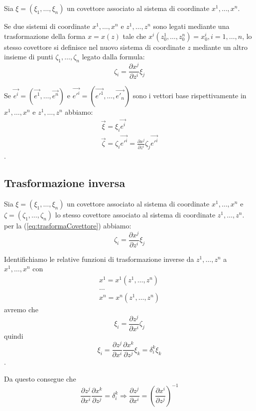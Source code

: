 \documentclass[a4paper,11pt]{article}
\begin{document}
Sia $\xi = (\xi_1, \dots , \xi_n)$ un covettore associato al sistema di coordinate $ x^1, \dots , x^n $.

Se due sistemi di coordinate $ x^1, \dots , x^n $ e $  z^1, \dots , z^n  $ sono legati mediante una trasformazione della forma $ x= x(z) $ tale che $ x^i (z_0^1, \dots , z_0^n) = x_0^i, i = 1, \dots , n $, lo stesso covettore si definisce nel nuovo sistema di coordinate $ z $ mediante un altro insieme di punti 
$ \zeta_1, \dots, \zeta_n $ legato dalla formula:
\begin{equation}\label{eq:trasformaCovettore}
  \zeta_i = \frac{\partial x^j}{\partial z^i} \xi_j
\end{equation}

Se $ \vec {e^i} = (\vec {e^1}, \dots, \vec {e^n}) $ e $ \vec {{e'}^i} = (\vec { {e'}^1}, \dots, \vec {{e'}_n}) $ sono i vettori base rispettivamente in $ x^1, \dots , x^n $ e $ z^1, \dots , z^n $ abbiamo:
\begin{eqnarray*}
  \vec \xi = \xi_i \vec {e^i}
  \\
  \vec \zeta = \zeta_i \vec {{e'}^i} = \frac{\partial x^j}{\partial z^i} \zeta_j \vec {{e'}^i}
\end{eqnarray*}
.

\subsection{Trasformazione inversa}

Sia $\xi = (\xi_1, \dots , \xi_n)$ un covettore associato al sistema di coordinate $ x^1, \dots , x^n $ e 
$\zeta = (\zeta_1, \dots , \zeta_n)$ lo stesso covettore associato al sistema di coordinate $ z^1, \dots , z^n $.
per la (\ref{eq:trasformaCovettore}) abbiamo:
\[
  \zeta_i = \frac{\partial x^j}{\partial z^i} \xi_j
\]

Identifichiamo le relative funzioni di trasformazione inverse da $ z^1, \dots , z^n $ a  $ x^1, \dots , x^n $  con
\begin{eqnarray*}
  x^1=x^1(z^1, \dots, z^n)
  \\
  \dots
  \\
  x^n=x^n(z^1, \dots, z^n)
\end{eqnarray*}
avremo che 
\[
  \xi_i = \frac{\partial z^j}{\partial x^i} \zeta_j
\]
quindi
\[
  \xi_i = \frac{\partial z^j}{\partial x^i} \frac{\partial x^k}{\partial z^j}  \xi_k = \delta _i^k \xi _k
\].

Da questo consegue che
\begin{equation}
	\frac{\partial z^j}{\partial x^i} \frac{\partial x^k}{\partial z^j} = \delta _i^k
\Longrightarrow
	\frac{\partial z^j}{\partial x^i} = \left( \frac{\partial x^i}{\partial z^j} \right)^{-1}
\end{equation}
\end{document}
